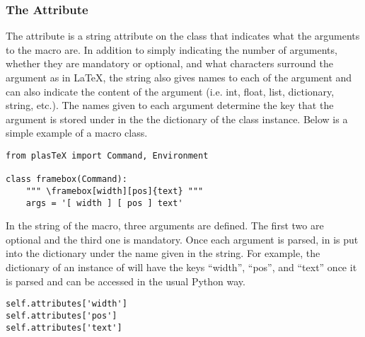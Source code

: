\subsubsection{The  Attribute}

The  attribute is a string attribute on the class
that indicates what the arguments to the macro are.  In addition to
simply indicating the number of arguments, whether they are mandatory
or optional, and what characters surround the argument as in \LaTeX,
the  string also gives names to each of the argument
and can also indicate the content of the argument (i.e. int, float,
list, dictionary, string, etc.).  The names given to each argument
determine the key that the argument is stored under in the the
 dictionary of the class instance.  Below is a simple
example of a macro class.
\begin{verbatim}
from plasTeX import Command, Environment

class framebox(Command):
    """ \framebox[width][pos]{text} """
    args = '[ width ] [ pos ] text'
\end{verbatim}

In the  string of the  macro, three arguments
are defined.  The first two are optional and the third one is mandatory.
Once each argument is parsed, in is put into the 
dictionary under the name given in the  string.  For example,
the  dictionary of an instance of 
will have the keys ``width'', ``pos'', and ``text'' once it is parsed
and can be accessed in the usual Python way.
\begin{verbatim}
self.attributes['width']
self.attributes['pos']
self.attributes['text']
\end{verbatim}

